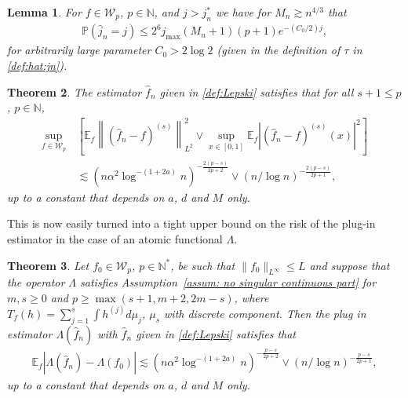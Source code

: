 \documentclass[preprint]{imsart}
\newcommand{\E}{{\mathbb E}}
\newcommand\norm[1]{\left\lVert#1\right\rVert}
\newtheorem{theorem}{Theorem}[section]
\newtheorem{lemma}[theorem]{Lemma}
\numberwithin{equation}{section}
\begin{document}
\begin{lemma}\label{lem:overshoot}
For $f\in\mathcal{W}_{p}$, $p\in\mathbb{N}$, and $j>j_n^*$ we have for $M_n\gtrsim n^{4/3}$  that
\begin{align*}
\mathbb{P}(\hat{j}_n=j)\leq  2^6j_{\max} (M_n+1)( p+1) e^{-(C_0/2)j},
\end{align*}
for  arbitrarily large parameter $C_0>2\log 2$ (given in the definition of $\tau$ in \eqref{def:hat:jn}). 
\end{lemma}





\begin{theorem}\label{thm:lepski}
The estimator $\hat{f}_n$ given in \eqref{def:Lepski} satisfies that for all $s+1\leq p$, $p\in\mathbb{N}$,
\begin{align*}
\sup_{f\in\mathcal{W}_{p}}\, &\left[\E_f\norm{(\hat{f}_n- f)^{(s)}}_{L^2}^2\vee \sup_{x\in[0,1]} \E_f\left|(\hat{f}_n-f)^{(s)}(x)\right|^2\right]\\
& \lesssim (n\alpha^2\log^{-(1+2a)} n)^{-\frac{2(p-s)}{2p+2}}\vee (n/\log n)^{-\frac{2(p-s)}{2p+1}},
\end{align*}
up to a constant that depends on $a$, $d$ and $M$ only.
\end{theorem}


This is now easily turned into a tight upper bound on the risk of the plug-in estimator in the case of an atomic functional $\Lambda$.


\begin{theorem}\label{th: adaptive rate semiparam splwav}
Let $f_0\in \mathcal{W}_{p}$, $p\in\mathbb{N}^*$, be such that $\|f_0\|_{L^\infty}\leq L$ and suppose that the operator $\Lambda$ satisfies Assumption~\ref{assum: no singular continuous part} for $m,s\geq 0$ and $p\geq \max(s+1,m+2,2m-s)$, where $T_f(h)=\sum_{j=1}^s \int h^{(j)}d\mu_j$, $\mu_s$ with discrete component. Then the plug in estimator $\Lambda(\hat{f}_n)$ with $\hat{f}_n$ given in \eqref{def:Lepski} satisfies that
\begin{align*}
\E_f|\Lambda(\hat{f}_n)- \Lambda(f_0)|\lesssim (n\alpha^2\log^{-(1+2a)} n)^{-\frac{p-s}{2p+2}}\vee (n/\log n)^{-\frac{p-s}{2p+1}},
\end{align*}
up to a constant that depends on $a$, $d$ and $M$ only.
\end{theorem}
\end{document}
